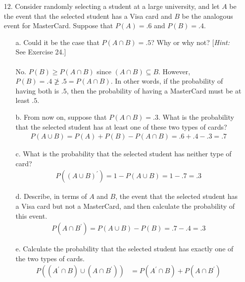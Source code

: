 \documentclass[letterpaper,12pt]{article}
\begin{document}
\maketitle

\begin{enumerate}
  \item[12.]
    Consider randomly selecting a student at a large university, and let $A$ be the event that the selected student has a Visa card and $B$ be the analogous event for MasterCard. Suppose that $P(A) = .6$ and $P(B) = .4$.
    \begin{enumerate}
      \item[a.]
        Could it be the case that $P(A \cap B) = .5$? Why or why not? [\textit{Hint:} See Exercise 24.]
        \\ \\
        No. $P(B) \geq P(A \cap B)$ since $(A \cap B) \subseteq B$. However, $P(B) = .4 \not\geq .5 = P(A \cap B)$. In other words, if the probability of having both is $.5$, then the probability of having a MasterCard must be at least $.5$.
      \item[b.]
        From now on, suppose that $P(A \cap B) = .3$. What is the probability that the selected student has at least one of these two types of cards?
        \begin{align*}
          P(A \cup B) = P(A) + P(B) - P(A \cap B) = .6 + .4 - .3 = .7
        \end{align*}
      \item[c.]
        What is the probability that the selected student has neither type of card?
        \begin{align*}
          P((A \cup B)^\prime) = 1 - P(A \cup B) = 1 - .7 = .3
        \end{align*}
      \item[d.]
        Describe, in terms of $A$ and $B$, the event that the selected student has a Visa card but not a MasterCard, and then calculate the probability of this event.
        \begin{align*}
          P(A \cap B^\prime) = P(A \cup B) - P(B) = .7 - .4 = .3
        \end{align*}
      \item[e.]
        Calculate the probability that the selected student has exactly one of the two types of cards.
        \begin{align*}
          P((A^\prime \cap B) \cup (A \cap B^\prime)) &= P(A^\prime \cap B) + P(A \cap B^\prime) \\

\end{align*}
\end{enumerate}
\end{enumerate}
\end{document}

